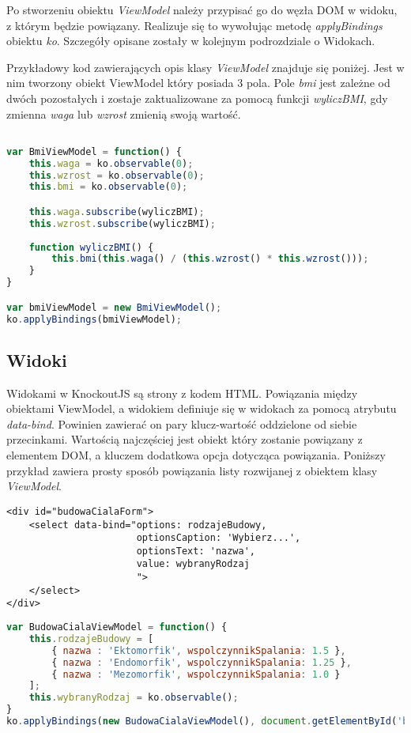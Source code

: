 Po stworzeniu obiektu \textit{ViewModel} należy przypisać go do węzła DOM w widoku, z którym będzie powiązany. Realizuje się to wywołując metodę \textit{applyBindings} obiektu \textit{ko}. Szczegóły opisane zostały w kolejnym podrozdziale o Widokach.

Przykładowy kod zawierających opis klasy \textit{ViewModel} znajduje się poniżej. Jest w nim tworzony obiekt ViewModel który posiada 3 pola. Pole \textit{bmi} jest zależne od dwóch pozostałych i zostaje zaktualizowane za pomocą funkcji \textit{wyliczBMI}, gdy zmienna  \textit{waga} lub \textit{wzrost} zmienią swoją wartość.

\begin{lstlisting}[language=JavaScript]

var BmiViewModel = function() {
	this.waga = ko.observable(0);
	this.wzrost = ko.observable(0);
	this.bmi = ko.observable(0);

    this.waga.subscribe(wyliczBMI);
    this.wzrost.subscribe(wyliczBMI);
	
	function wyliczBMI() {
		this.bmi(this.waga() / (this.wzrost() * this.wzrost()));
	}
}

var bmiViewModel = new BmiViewModel();
ko.applyBindings(bmiViewModel);

\end{lstlisting}


\subsection{Widoki}
Widokami w KnockoutJS są strony z kodem HTML. Powiązania między obiektami ViewModel, a widokiem definiuje się w widokach za pomocą atrybutu \textit{data-bind}. Powinien zawierać on pary klucz-wartość oddzielone od siebie przecinkami. Wartością najczęściej jest obiekt który zostanie powiązany z elementem DOM, a kluczem dodatkowa opcja dotycząca powiązania. Poniższy przykład zawiera prosty sposób powiązania listy rozwijanej z obiektem klasy \textit{ViewModel}.

\begin{lstlisting}[language=HTML5]
<div id="budowaCialaForm">
	<select data-bind="options: rodzajeBudowy,
					   optionsCaption: 'Wybierz...',
					   optionsText: 'nazwa',
					   value: wybranyRodzaj
					   ">
	</select>
</div>
\end{lstlisting}

\begin{lstlisting}[language=JavaScript]
var BudowaCialaViewModel = function() {
	this.rodzajeBudowy = [
		{ nazwa : 'Ektomorfik', wspolczynnikSpalania: 1.5 },
		{ nazwa : 'Endomorfik', wspolczynnikSpalania: 1.25 },
		{ nazwa : 'Mezomorfik', wspolczynnikSpalania: 1.0 }
	];
    this.wybranyRodzaj = ko.observable();
}
ko.applyBindings(new BudowaCialaViewModel(), document.getElementById('budowaCialaForm'));
\end{lstlisting}


